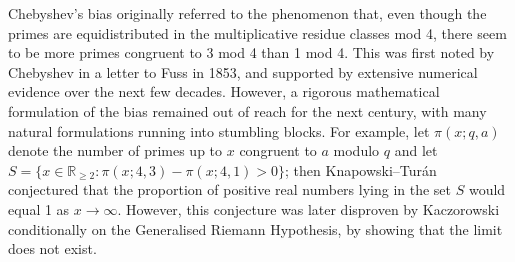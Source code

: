 \documentclass[12pt,reqno]{amsart}
\theoremstyle{definition}
\numberwithin{equation}{section}
\begin{document}

Chebyshev's bias originally referred to the phenomenon that, even though the primes are equidistributed in the multiplicative residue classes mod 4, there seem to be more primes congruent to 3 mod 4 than 1 mod 4. This was first noted by Chebyshev in a letter to Fuss in 1853, and supported by extensive numerical evidence over the next few decades. However, a rigorous mathematical formulation of the bias remained out of reach for the next century, with many natural formulations running into stumbling blocks. For example, let $\pi(x; q, a)$ denote the number of primes up to $x$ congruent to $a$ modulo $q$ and let $S=\{x \in \mathbb R_{\geq 2}: \pi(x; 4, 3)-\pi(x; 4, 1)>0\}$; then Knapowski--Tur\'{a}n~\cite{KnapowskiTuran1962} conjectured that the proportion of positive real numbers lying in the set $S$ would equal 1 as $x \to \infty$.  However, this conjecture was later disproven by Kaczorowski~\cite{Kaczorowski1995}  conditionally on the Generalised Riemann Hypothesis, by showing that the limit does not exist. 
\end{document}
